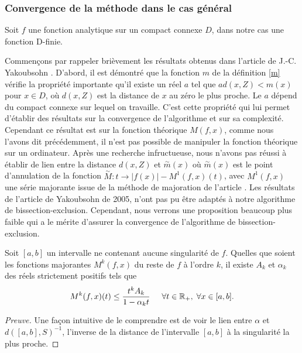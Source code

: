 \documentclass[a4paper,10pt]{article}
\begin{document}
	\subsubsection{Convergence de la méthode dans le cas général}
	Soit $f$ une fonction analytique sur un compact connexe $D$, dans notre cas une fonction D-finie.
	
	Commençons par rappeler brièvement les résultats obtenus dans l'article de J.-C. Yakoubsohn \cite{DBLP:journals/jc/Yakoubsohn05}. 
	D'abord, il est démontré que la fonction $m$ de la définition \eqref{m} vérifie la propriété importante qu'il existe un réel $a$ tel que 
	$a d(x,Z)<m(x)$ pour $x \in D$, où $d(x,Z)$ est la distance de $x$ au zéro le plus proche. Le $a$ dépend du compact connexe sur lequel on travaille. 
	C'est cette propriété qui lui permet d'établir des résultats sur la convergence de l'algorithme et sur sa complexité.\\
	Cependant ce résultat est sur la fonction théorique $M(f,x)$, comme nous l'avons dit précédemment, il n'est pas possible de manipuler la fonction théorique 
	sur un ordinateur. Après une recherche infructueuse, nous n'avons pas réussi à établir de lien entre la distance $d(x,Z)$ et $\overset{\sim}{m}(x)$ où $\overset{\sim}{m}(x)$ est le point d'annulation de la fonction $\overset{\sim}{M}: t \rightarrow |f(x)|-M^1(f,x)(t)$, avec $M^{1}(f,x)$ une série majorante issue de la méthode de majoration de l'article \cite{Mezzarobba2019}.  
	Les résultats de l'article de Yakoubsohn de 2005, n'ont pas pu être adaptés à notre algorithme de bissection-exclusion. Cependant, nous verrons une proposition beaucoup plus faible qui a le mérite d'assurer la convergence de l'algorithme de bissection-exclusion.
	
	\begin{conjecture}
		Soit $[a,b]$ un intervalle ne contenant aucune singularité de $f$. Quelles que soient les fonctions majorantes $M^k(f,x)$ du reste de $f$ à l'ordre $k$, il existe $A_k$ et $\alpha_k$ des réels strictement positifs tels que 
		\[M^k(f,x)(t) \leq \frac{t^kA_k}{1-\alpha_k t} \hspace{5mm} \forall t \in \mathbb{R}_+,\hspace{1mm} \forall x \in [a,b].\] 
		\label{Maj_maj}
	\end{conjecture}
	\begin{proof}[Preuve]
		Une façon intuitive de le comprendre est de voir le lien entre $\alpha$ et $d([a,b],S)^{-1}$, l'inverse de la distance de l'intervalle $[a,b]$ à la singularité la plus proche. 
	\end{proof}
	
\end{document}
